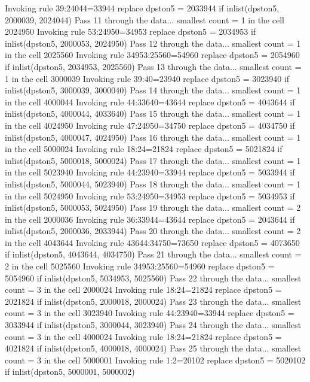   Invoking rule 39:24044=33944
  replace dpston5 = 2033944 if inlist(dpston5, 2000039, 2024044)
Pass 11 through the data...
  smallest count = 1 in the cell      2024950
  Invoking rule 53:24950=34953
  replace dpston5 = 2034953 if inlist(dpston5, 2000053, 2024950)
Pass 12 through the data...
  smallest count = 1 in the cell      2025560
  Invoking rule 34953:25560=54960
  replace dpston5 = 2054960 if inlist(dpston5, 2034953, 2025560)
Pass 13 through the data...
  smallest count = 1 in the cell      3000039
  Invoking rule 39:40=23940
  replace dpston5 = 3023940 if inlist(dpston5, 3000039, 3000040)
Pass 14 through the data...
  smallest count = 1 in the cell      4000044
  Invoking rule 44:33640=43644
  replace dpston5 = 4043644 if inlist(dpston5, 4000044, 4033640)
Pass 15 through the data...
  smallest count = 1 in the cell      4024950
  Invoking rule 47:24950=34750
  replace dpston5 = 4034750 if inlist(dpston5, 4000047, 4024950)
Pass 16 through the data...
  smallest count = 1 in the cell      5000024
  Invoking rule 18:24=21824
  replace dpston5 = 5021824 if inlist(dpston5, 5000018, 5000024)
Pass 17 through the data...
  smallest count = 1 in the cell      5023940
  Invoking rule 44:23940=33944
  replace dpston5 = 5033944 if inlist(dpston5, 5000044, 5023940)
Pass 18 through the data...
  smallest count = 1 in the cell      5024950
  Invoking rule 53:24950=34953
  replace dpston5 = 5034953 if inlist(dpston5, 5000053, 5024950)
Pass 19 through the data...
  smallest count = 2 in the cell      2000036
  Invoking rule 36:33944=43644
  replace dpston5 = 2043644 if inlist(dpston5, 2000036, 2033944)
Pass 20 through the data...
  smallest count = 2 in the cell      4043644
  Invoking rule 43644:34750=73650
  replace dpston5 = 4073650 if inlist(dpston5, 4043644, 4034750)
Pass 21 through the data...
  smallest count = 2 in the cell      5025560
  Invoking rule 34953:25560=54960
  replace dpston5 = 5054960 if inlist(dpston5, 5034953, 5025560)
Pass 22 through the data...
  smallest count = 3 in the cell      2000024
  Invoking rule 18:24=21824
  replace dpston5 = 2021824 if inlist(dpston5, 2000018, 2000024)
Pass 23 through the data...
  smallest count = 3 in the cell      3023940
  Invoking rule 44:23940=33944
  replace dpston5 = 3033944 if inlist(dpston5, 3000044, 3023940)
Pass 24 through the data...
  smallest count = 3 in the cell      4000024
  Invoking rule 18:24=21824
  replace dpston5 = 4021824 if inlist(dpston5, 4000018, 4000024)
Pass 25 through the data...
  smallest count = 3 in the cell      5000001
  Invoking rule 1:2=20102
  replace dpston5 = 5020102 if inlist(dpston5, 5000001, 5000002)
